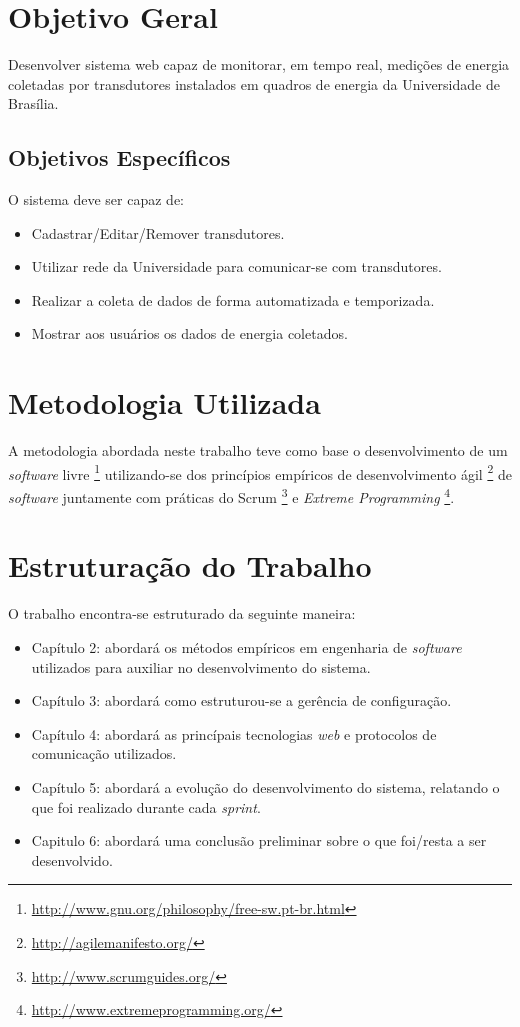 \section{Objetivo Geral}
Desenvolver sistema web capaz de monitorar, em tempo real, medições de energia coletadas por transdutores
instalados em quadros de energia da Universidade de Brasília.

\subsection{Objetivos Específicos}
O sistema deve ser capaz de:
\begin{itemize}
    \item Cadastrar/Editar/Remover transdutores.
    \item Utilizar rede da Universidade para comunicar-se com transdutores.
    \item Realizar a coleta de dados de forma automatizada e temporizada.
    \item Mostrar aos usuários os dados de energia coletados.
\end{itemize}

\section{Metodologia Utilizada}
A metodologia abordada neste trabalho teve como base o desenvolvimento de um \textit{software} livre \footnote{\url{http://www.gnu.org/philosophy/free-sw.pt-br.html}} utilizando-se dos princípios empíricos de desenvolvimento ágil \footnote{\url{http://agilemanifesto.org/}} de \textit{software} juntamente com práticas do Scrum \footnote{\url{http://www.scrumguides.org/}} e \textit{Extreme Programming} \footnote{\url{http://www.extremeprogramming.org/}}.

\section{Estruturação do Trabalho}
O trabalho encontra-se estruturado da seguinte maneira:

\begin{itemize}
    \item Capítulo 2: abordará os métodos empíricos em engenharia de \textit{software} utilizados para
    auxiliar no desenvolvimento do sistema.
    \item Capítulo 3: abordará como estruturou-se a gerência de configuração.
    \item Capítulo 4: abordará as princípais tecnologias \textit{web} e protocolos de comunicação utilizados.
    \item Capítulo 5: abordará a evolução do desenvolvimento do sistema, relatando o que foi realizado durante cada \textit{sprint}.
    \item Capitulo 6: abordará uma conclusão preliminar sobre o que foi/resta a ser desenvolvido.
\end{itemize}
